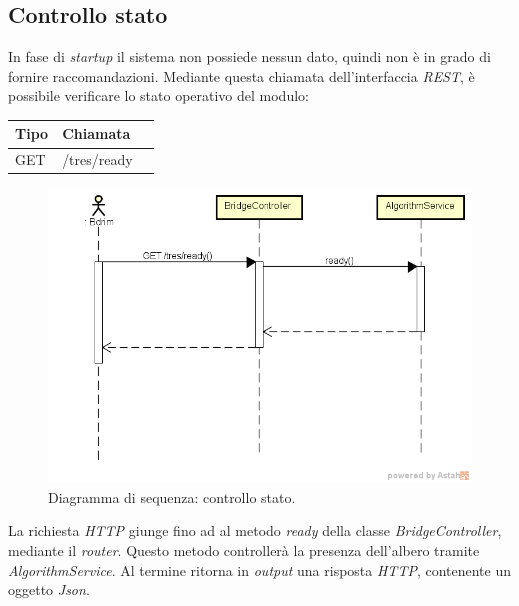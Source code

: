 \subsection{Controllo stato}
In fase di \emph{startup} il sistema non possiede nessun dato, quindi non è in grado di fornire raccomandazioni. Mediante questa chiamata dell'interfaccia \emph{REST}, è possibile verificare lo stato operativo del modulo:\\
\def\arraystretch{1.5}
\begin{longtable}{|p{2.5cm}|p{5cm}|l|}
\hline
\textbf{Tipo} &	\textbf{Chiamata}	\\\hline
GET		&	/tres/ready		 \\\hline
\end{longtable}
\begin{figure}[h]
\centering
\includegraphics[scale=0.43]{immagini/DScheckstate}
\caption{Diagramma di sequenza: controllo stato.}
\label{fig:seq-controllostato}
\end{figure}
La richiesta \emph{HTTP} giunge fino ad al metodo \emph{ready} della classe \emph{BridgeController}, mediante il \emph{router}. Questo metodo controllerà la presenza dell'albero tramite \emph{AlgorithmService}. Al termine ritorna in \emph{output} una risposta \emph{HTTP}, contenente un oggetto \emph{Json}.
\newpage
